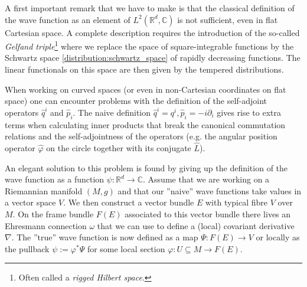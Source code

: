     \begin{remark}
        A first important remark that we have to make is that the classical definition of the wave function as an element of $L^2(\mathbb{R}^d, \mathbb{C})$ is not sufficient, even in flat Cartesian space. A complete description requires the introduction of the so-called \textit{Gelfand triple}\footnote{Often called a \textit{rigged Hilbert space}.} where we replace the space of square-integrable functions by the Schwartz space \ref{distribution:schwartz_space} of rapidly decreasing functions. The linear functionals on this space are then given by the tempered distributions.
    \end{remark}

    \begin{construct}
        When working on curved spaces (or even in non-Cartesian coordinates on flat space) one can encounter problems with the definition of the self-adjoint operators $\hat{q}^i$ and $\hat{p}_i$. The naive definition $\hat{q}^i = q^i, \hat{p}_i = -i\partial_i$ gives rise to extra terms when calculating inner products that break the canonical commutation relations and the self-adjointness of the operators (e.g. the angular position operator $\hat{\varphi}$ on the circle together with its conjugate $\hat{L}$).

        An elegant solution to this problem is found by giving up the definition of the wave function as a function $\psi:\mathbb{R}^d\rightarrow\mathbb{C}$. Assume that we are working on a Riemannian manifold $(M, g)$ and that our ''naive'' wave functions take values in a vector space $V$. We then construct a vector bundle $E$ with typical fibre $V$ over $M$. On the frame bundle $F(E)$ associated to this vector bundle there lives an Ehresmann connection $\omega$ that we can use to define a (local) covariant derivative $\nabla$. The ''true'' wave function is now defined as a map $\Psi: F(E)\rightarrow V$ or locally as the pullback $\psi := \varphi^*\Psi$ for some local section $\varphi:U\subseteq M\rightarrow F(E)$.


\end{construct}
